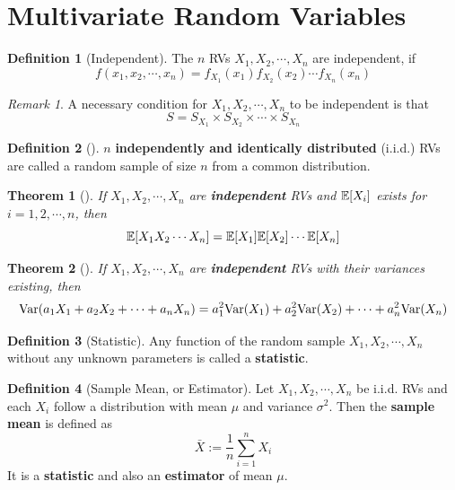 \documentclass[10pt,UTF8]{article}
\newenvironment{definition box}
{\begin{tcolorbox}[colback=blue!5!white,colframe=blue!75!black,parbox=false,before upper=\par,before lower=\par]}
{\end{tcolorbox}}
\newenvironment{theorem box}
{\begin{tcolorbox}[colback=yellow!5!white,colframe=yellow!75!black,parbox=false,before upper=\par,before lower=\par]}
{\end{tcolorbox}}
\theoremstyle{definition}
\newtheorem{definition inner}{Definition}[section]
\newenvironment{definition}[1][]
{\begin{definition box}\begin{definition inner}[#1]\hfill\par}
{\end{definition inner}\end{definition box}}
\theoremstyle{plain}
\newtheorem{theorem inner}{Theorem}[section]
\newenvironment{theorem}[1][]
{\begin{theorem box}\begin{theorem inner}[#1]\hfill\par}
{\end{theorem inner}\end{theorem box}}
\theoremstyle{definition}
\newtheorem*{proof inner}{\textit{Proof}}
\theoremstyle{remark}
\newtheorem*{remark}{\textit{Remark}}
\newcommand{\E}[1]{\mathbb{E}\qty[#1]}  %
\newcommand{\Var}{\mathrm{Var}\qty}  %
\begin{document}
\section{Multivariate Random Variables}


\begin{definition}[Independent]
    The $n$ RVs $X_1, X_2, \cdots, X_n$ are independent, if
    \begin{equation*}
        f(x_1, x_2, \cdots, x_n) = f_{X_1}(x_1)f_{X_2}(x_2)\cdots f_{X_n}(x_n)
    \end{equation*}
\end{definition}
\begin{remark}
    A necessary condition for $X_1, X_2, \cdots, X_n$ to be independent is that
    \begin{equation*}
        S = S_{X_1} \times S_{X_2} \times \cdots \times S_{X_n}
    \end{equation*}
\end{remark}


\begin{definition}
    $n$ \textbf{independently and identically distributed} (i.i.d.) RVs are called
    a random sample of size $n$ from a common distribution.
\end{definition}


\begin{theorem}
    If $X_1, X_2, \cdots, X_n$ are \textbf{independent} RVs and
    $\E{X_i}$ exists for $i=1,2,\cdots,n$, then
    \begin{equation*}
        \E{X_1  X_2  \cdots  X_n} = \E{X_1}  \E{X_2}  \cdots  \E{X_n}
    \end{equation*}
\end{theorem}

\begin{theorem}
    If $X_1, X_2, \cdots, X_n$ are \textbf{independent} RVs with their variances
    existing, then
    \begin{gather*}
        \Var(a_1 X_1 + a_2 X_2 + \cdots + a_n X_n) =
        a_1^2 \Var(X_1) + a_2^2 \Var(X_2) + \cdots + a_n^2 \Var(X_n)
    \end{gather*}
\end{theorem}


\begin{definition}[Statistic]
    Any function of the random sample $X_1, X_2, \cdots, X_n$
    without any unknown parameters is called a \textbf{statistic}.
\end{definition}

\begin{definition}[Sample Mean, or Estimator]
    Let $X_1, X_2, \cdots, X_n$ be i.i.d. RVs and
    each $X_i$ follow a distribution with mean $\mu$ and variance $\sigma^2$.
    Then the \textbf{sample mean} is defined as
    \begin{equation*}
        \bar{X} := \frac{1}{n}\sum_{i=1}^n X_i
    \end{equation*}
    It is a \textbf{statistic} and also an \textbf{estimator} of mean $\mu$.
\end{definition}
\end{document}
